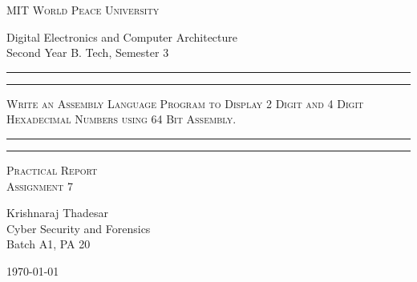 \documentclass[11pt]{article}
\begin{document}
\begin{titlepage}
	\centering


	\huge\textsc{
		MIT World Peace University
	}\\

	\vspace{0.75\baselineskip} %

	\LARGE{
		Digital Electronics and Computer Architecture\\
		Second Year B. Tech, Semester 3
	}

	\vfill %


	\rule{\textwidth}{1.6pt}\vspace*{-\baselineskip}\vspace*{2pt}
	\rule{\textwidth}{0.6pt}
	\vspace{0.75\baselineskip} %



	\huge{\textsc{
			Write an Assembly Language Program to Display 2 Digit and 4 Digit Hexadecimal Numbers using 64 Bit Assembly.
		}} \\



	\vspace{0.5\baselineskip} %
	\rule{\textwidth}{0.6pt}\vspace*{-\baselineskip}\vspace*{2.8pt}
	\rule{\textwidth}{1.6pt}

	\vspace{1\baselineskip} %


	\LARGE\textsc{
		Practical Report\\
		Assignment 7
	} %
	\vfill


	\vspace{0.5\baselineskip} %

	\Large{
		Krishnaraj Thadesar \\
		Cyber Security and Forensics\\
		Batch A1, PA 20
	}


	\vspace{0.5\baselineskip} %
	\today

\end{titlepage}
\end{document}

